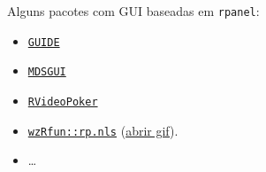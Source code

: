 \begin{frame}

  Alguns pacotes com GUI baseadas em \texttt{rpanel}:
  \begin{itemize}
  \item \href{http://cran.r-project.org/web/packages/GUIDE/index.html}{\texttt{GUIDE}}
  \item \href{http://cran.r-project.org/web/packages/MDSGUI/index.html}{\texttt{MDSGUI}}
  \item \href{http://cran.r-project.org/web/packages/RVideoPoker/index.html}{\texttt{RVideoPoker}}
  \item
    \href{https://github.com/walmes/wzRfun/blob/master/R/rp.nls.R}{\texttt{wzRfun::rp.nls}}
    (\href{run:./images/rp-nls.gif}{abrir gif}).
  \item \ldots
  \end{itemize}

\end{frame}

